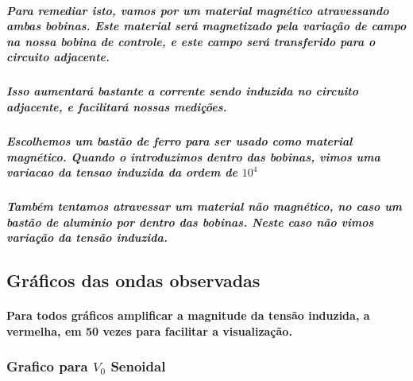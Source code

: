 \documentclass[12pt,twoside, a4paper, twocolumn]{article}
\begin{document}
\subparagraph*{Para remediar isto, vamos por um material magnético atravessando ambas bobinas. Este material será magnetizado pela variação de campo na nossa bobina de controle, e este campo será transferido para o circuito adjacente.}

\subparagraph*{Isso aumentará bastante a corrente sendo induzida no circuito adjacente, e facilitará nossas medições.}

\subparagraph*{Escolhemos um bastão de ferro para ser usado como material magnético. Quando o introduzimos dentro das bobinas, vimos uma variacao da tensao induzida da ordem de $10^4$}

\subparagraph*{Também tentamos atravessar um material não magnético, no caso um bastão de aluminio por dentro das bobinas. Neste caso não vimos variação da tensão induzida.}

\subsection{Gráficos das ondas observadas}

\paragraph*{Para todos gráficos amplificar a magnitude da tensão induzida, a vermelha, em 50 vezes para facilitar a visualização.}

\subsubsection{Grafico para $V_0$ Senoidal}

\begin{adjustbox}{scale=0.5}

\end{adjustbox}
\end{document}

